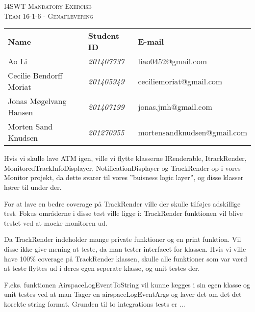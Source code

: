 


	
	\begin{center}
		\textsc{\large I4SWT Mandatory Exercise}\\[0.5cm]
		
		\textsc{\Large Team 16-1-6 - Genaflevering}\\
		\begin{center}
			\begin{tabular}{l l l}
				\textbf{Name} & \textbf{Student ID} & \textbf{E-mail} \\
				Ao Li & \textsl{201407737} &  liao0452@gmail.com  \\
				Cecilie Bendorff Moriat & \textsl{201405949} & ceciliemoriat@gmail.com \\
				Jonas Møgelvang Hansen & \textsl{201407199} & jonas.jmh@gmail.com \\
				Morten Sand Knudsen & \textsl{201270955} & mortensandknudsen@gmail.com \\
				
			\end{tabular}
		\end{center}
	\end{center}
	
	Hvis vi skulle lave ATM igen, ville vi flytte klasserne IRenderable, ItrackRender,
	MonitoredTrackInfoDisplayer, NotificationDisplayer og TrackRender op i vores Monitor projekt, da dette
	svarer til vores ”buisness logic layer”, og disse klasser hører til under der.
	
	For at lave en bedre coverage på TrackRender ville der skulle tilføjes adskillige test. Fokus områderne i
	disse test ville ligge i:
	TrackRender funktionen vil blive testet ved at mocke monitoren ud.
	
	Da TrackRender indeholder mange private funktioner og en print funktion. Vil disse ikke give mening at
	teste, da man tester interfacet for klassen.
	Hvis vi ville have 100\% coverage på TrackRender klassen, skulle alle funktioner som var værd at teste flyttes
	ud i deres egen seperate klasse, og unit testes der.
	
	F.eks. funktionen AirspaceLogEventToString vil kunne lægges i sin egen klasse og unit testes ved at man
	Tager en airspaceLogEventArgs og laver det om det det korekte string format.
	Grunden til to integrations tests er ...
	
